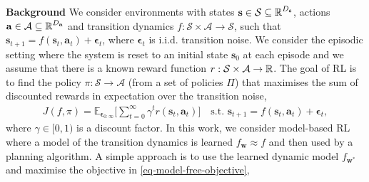 \documentclass{article}
\newcommand{\state}{\ensuremath{\mathbf{s}}}
\newcommand{\action}{\ensuremath{\mathbf{a}}}
\newcommand{\noise}{\ensuremath{\bm\epsilon}}
\newcommand{\discount}{\ensuremath{\gamma}}
\newcommand{\stateDomain}{\ensuremath{\mathcal{S}}}
\newcommand{\actionDomain}{\ensuremath{\mathcal{A}}}
\newcommand{\policyDomain}{\ensuremath{\Pi}}
\newcommand{\rewardFn}{\ensuremath{r}}
\newcommand{\transitionFn}{\ensuremath{f}}
\newcommand{\policy}{\ensuremath{\pi}}
\begin{document}
\textbf{Background}
We consider environments with states \(\state \in \stateDomain \subseteq \R^{D_{\state}} \),
actions \(\action \in \actionDomain \subseteq \R^{D_{\action}}\) and transition dynamics
\(\transitionFn: \stateDomain \times \actionDomain \rightarrow \stateDomain \), such that
$\state_{t+1} = \transitionFn(\state_{t}, \action_{t}) + \noise_{t}$, where  $\noise_{t}$
is i.i.d. transition noise.
We consider the episodic setting where the system is reset to an initial state $\state_{0}$ at each episode and we
assume that there is a known reward function $r : \stateDomain \times \actionDomain \rightarrow \R$.
The goal of RL is to find the policy \(\pi : \stateDomain \rightarrow \actionDomain\)
(from a set of policies $\Pi$) that maximises the sum of discounted rewards
in expectation over the transition noise,
\begin{align} \label{eq-model-free-objective}
J(\transitionFn, \policy) = \mathbb{E}_{\noise_{0:\infty}} \bigg[ \sum_{t=0}^{\infty} \discount^{t} \rewardFn(\state_{t},\action_{t}) \bigg]
\quad \text{s.t. } \state_{t+1} = \transitionFn(\state_{t}, \action_{t}) + \noise_{t},
\end{align}
where $\gamma \in [0, 1)$ is a discount factor.
In this work, we consider model-based RL where a model of the transition dynamics is learned \(f_{\mathbf{w}} \approx \transitionFn\) and then used by a planning algorithm.
A simple approach is to use the learned dynamic model $f_{\mathbf{w}^{*}}$ and maximise the objective in \cref{eq-model-free-objective},
\end{document}

